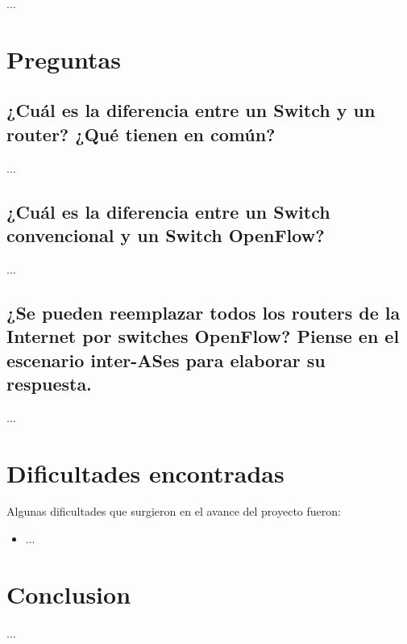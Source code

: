 \documentclass[titlepage,a4paper]{article}
\begin{document}
...

\section{Preguntas}\label{sec:preguntasAResponder}

    \subsection{¿Cuál es la diferencia entre un Switch y un router? ¿Qué tienen en común?}

    ...
        
    \subsection{¿Cuál es la diferencia entre un Switch convencional y un Switch OpenFlow?}

    ...
     
    \subsection{¿Se pueden reemplazar todos los routers de la Internet por switches OpenFlow? Piense en el escenario inter-ASes para elaborar su respuesta.}
    ...
    
    \section{Dificultades encontradas}\label{sec:dificultadesEncontras}
    Algunas dificultades que surgieron en el avance del proyecto fueron:
    
    \begin{itemize}
        \item ...
    \end{itemize}
    
\section{Conclusion}\label{conclusion}
    ...
    
\end{document}
